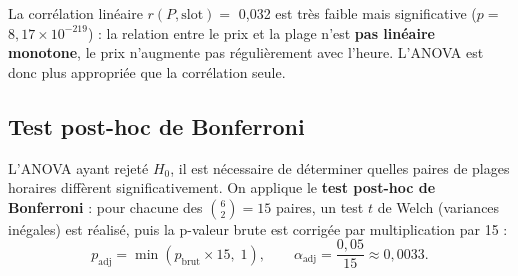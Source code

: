 \documentclass[11pt,a4paper]{article}
\begin{document}
La corrélation linéaire $r(P, \text{slot}) = $ 0{,}032 est très faible mais significative
($p = $ $8{,}17 \times 10^{-219}$) : la relation entre le prix et la plage n'est \textbf{pas linéaire monotone}, le prix
n'augmente pas régulièrement avec l'heure. L'ANOVA est donc plus appropriée que la corrélation seule.

\subsection{Test post-hoc de Bonferroni}

L'ANOVA ayant rejeté $H_0$, il est nécessaire de déterminer quelles paires de plages horaires diffèrent
significativement. On applique le \textbf{test post-hoc de Bonferroni} : pour chacune des $\binom{6}{2} = 15$
paires, un test $t$ de Welch (variances inégales) est réalisé, puis la p-valeur brute est corrigée par
multiplication par 15 :
\[
p_{\text{adj}} = \min(p_{\text{brut}} \times 15,\; 1), \qquad \alpha_{\text{adj}} = \frac{0{,}05}{15} \approx 0{,}0033.
\]
\end{document}

